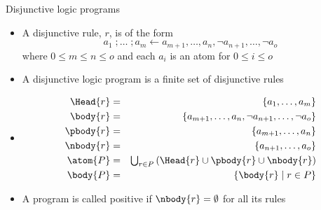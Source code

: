 \begin{frame}{Disjunctive logic programs}
  \label{eqn:rule:disjunctive}
  \begin{itemize}
  \item
    A \alert{disjunctive rule}, $r$, is of the form
    \[
    a_1\;;\dots\;;a_m\leftarrow a_{m+1},\dots,a_n,{\neg a_{n+1}},\dots,{\neg a_o}
    \]
    where $0\leq m\leq n\leq o$ and each $a_i$ is an atom for $0\leq i\leq o$
  \item
    A \alert{disjunctive logic program} is a finite {set} of disjunctive rules
  \item <2->
    \begin{eqnarray*}
      \Head{r}   &=& \{a_1,\dots,a_m\}
      \\
      \body{r}   &=& \{a_{m+1},\dots,a_n, {\neg a_{n+1}},\dots,{\neg a_o}\}
      \\
      \pbody{r}  &=& \{a_{m+1},\dots,a_n\}
      \\
      \nbody{r}  &=& \{a_{n+1},\dots,a_o\}
      \\
     \atom{P} &=& \mbox{$\bigcup$}_{r\in P}\left(\Head{r}\cup\pbody{r}\cup\nbody{r}\right)
      \\
     \body{P} &=& \{\body{r}\mid r\in P\}
    \end{eqnarray*}
  \item<3-> A program is called \alert{positive} if $\nbody{r}=\emptyset$ for all its rules
  \end{itemize}
\end{frame}
